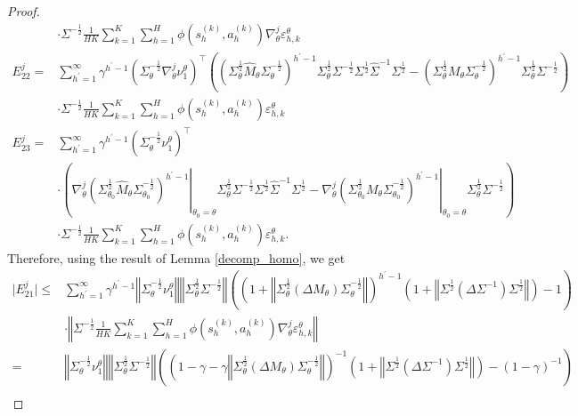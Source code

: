 \documentclass{article}
\numberwithin{equation}{section}
\begin{document}
\begin{proof}
\begin{align*}
    &\cdot\Sigma^{-\frac{1}{2}}\frac{1}{HK}\sum_{k=1}^K\sum_{h=1}^H\phi\left(s_h^{(k)},a_h^{(k)}\right)\nabla_\theta^j\varepsilon_{h,k}^\theta\\
    E_{22}^j=&\sum_{h^\prime=1}^\infty\gamma^{h^\prime-1}\left(\Sigma_\theta^{-\frac{1}{2}}\nabla_\theta^j\nu^\theta_1\right)^\top\left(\left(\Sigma_\theta^{\frac{1}{2}}\widehat{M}_\theta\Sigma_\theta^{-\frac{1}{2}}\right)^{h^\prime-1}\Sigma_\theta^{\frac{1}{2}}\Sigma^{-\frac{1}{2}}\Sigma^{\frac{1}{2}}\widehat{\Sigma}^{-1}\Sigma^{\frac{1}{2}}-\left(\Sigma_\theta^{\frac{1}{2}}M_\theta\Sigma_\theta^{-\frac{1}{2}}\right)^{h^\prime-1}\Sigma_\theta^{\frac{1}{2}}\Sigma^{-\frac{1}{2}}\right)\\
    &\cdot\Sigma^{-\frac{1}{2}}\frac{1}{HK}\sum_{k=1}^K\sum_{h=1}^H\phi\left(s_h^{(k)},a_h^{(k)}\right)\varepsilon_{h,k}^\theta\\
    E_{23}^j=&\sum_{h^\prime=1}^\infty\gamma^{h^\prime-1}\left(\Sigma_\theta^{-\frac{1}{2}}\nu^\theta_1\right)^\top\\
    &\cdot\left(\left.\nabla_\theta^j\left(\Sigma_{\theta_0}^{\frac{1}{2}}\widehat{M}_{\theta}\Sigma_{\theta_0}^{-\frac{1}{2}}\right)^{h^\prime-1}\right\vert_{\theta_0=\theta}\Sigma_\theta^{\frac{1}{2}}\Sigma^{-\frac{1}{2}}\Sigma^{\frac{1}{2}}\widehat{\Sigma}^{-1}\Sigma^{\frac{1}{2}}-\left.\nabla_\theta^j\left(\Sigma_{\theta_0}^{\frac{1}{2}}M_\theta\Sigma_{\theta_0}^{-\frac{1}{2}}\right)^{h^\prime-1}\right\vert_{\theta_0=\theta}\Sigma_\theta^{\frac{1}{2}}\Sigma^{-\frac{1}{2}}\right)\\
    &\cdot\Sigma^{-\frac{1}{2}}\frac{1}{HK}\sum_{k=1}^K\sum_{h=1}^H\phi\left(s_h^{(k)},a_h^{(k)}\right)\varepsilon_{h,k}^\theta.
\end{align*}
Therefore, using the result of Lemma \ref{decomp_homo}, we get
\begin{align*}
    \vert E_{21}^j\vert\leq&\sum_{h^\prime=1}^\infty\gamma^{h^\prime-1}\left\Vert\Sigma_\theta^{-\frac{1}{2}}\nu^\theta_1\right\Vert\left\Vert\Sigma_\theta^{\frac{1}{2}}\Sigma^{-\frac{1}{2}}\right\Vert\left(\left(1+\left\Vert\Sigma_\theta^{\frac{1}{2}}\left(\Delta M_\theta\right)\Sigma_\theta^{-\frac{1}{2}}\right\Vert\right)^{h^\prime-1}\left(1+\left\Vert\Sigma^{\frac{1}{2}}\left(\Delta\Sigma^{-1}\right)\Sigma^{\frac{1}{2}}\right\Vert\right)-1\right)\\
    &\cdot\left\Vert\Sigma^{-\frac{1}{2}}\frac{1}{HK}\sum_{k=1}^K\sum_{h=1}^H\phi\left(s_h^{(k)},a_h^{(k)}\right)\nabla_\theta^j\varepsilon_{h,k}^\theta\right\Vert\\
    =&\left\Vert\Sigma_\theta^{-\frac{1}{2}}\nu^\theta_1\right\Vert\left\Vert\Sigma_\theta^{\frac{1}{2}}\Sigma^{-\frac{1}{2}}\right\Vert\left(\left(1-\gamma-\gamma\left\Vert\Sigma_\theta^{\frac{1}{2}}\left(\Delta M_\theta\right)\Sigma_\theta^{-\frac{1}{2}}\right\Vert\right)^{-1}\left(1+\left\Vert\Sigma^{\frac{1}{2}}\left(\Delta\Sigma^{-1}\right)\Sigma^{\frac{1}{2}}\right\Vert\right)-\left(1-\gamma\right)^{-1}\right)\\

\end{align*}
\end{proof}
\end{document}
